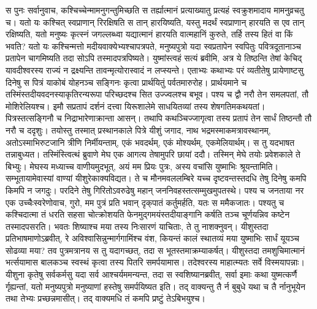 \vakya स पुनः सर्वानुवाच, कश्चिच्चेन्मामनुगन्तुमिच्छति स तर्ह्यात्मानं प्रत्याख्यातु प्रत्यहं स्वक्रुशमादाय मामनुव्रचतु च।
\vakya यतो यः कश्चित् स्वप्राणान् रिरक्षिषति स तान् हारयिष्यति, यस्तु मदर्थं स्वप्राणान् हारयति स एव तान् रक्षिष्यति,
\vakya यतो मनुष्यः कृत्स्नं जगल्लब्ध्वा यद्यात्मानं हारयति वात्महानिं कुरुते, तर्हि तस्य हितं वा किं भवति?
\vakya यतो यः कश्चिन्मत्तो मदीयवाक्येभ्यश्चापत्रपते, मनुष्यपुत्रो यदा स्वप्रतापेन स्वपितुः पवित्रदूतानाञ्च प्रतापेन चागमिष्यति तदा सोऽपि तस्मादपत्रपिष्यते।
\vakya युष्मांस्त्वहं सत्यं ब्रवीमि, अत्र ये तिष्ठन्ति तेषां केचिद् यावदीश्वरस्य राज्यं न द्रक्ष्यन्ति तावन्मृत्योरास्वादं न लप्स्यन्ते।
\vakya एताभ्यः कथाभ्यः परं व्यतीतेषु प्रायेणाष्टसु दिनेषु स पित्रं याकोबं योहनञ्च सङ्गिनः कृत्वा प्रार्थयितुं पर्वतमारुरोह।
\vakya प्रार्थयमाने च तस्मिंस्तदीयवदनस्याकृतिरन्यरूपा परिच्छदश्च सित उज्ज्वलश्च बभूव।
\vakya पश्य च द्वौ नरौ तेन समलपतां, तौ मोशिरेलियश्च।
\vakya इमौ सप्रतापं दर्शनं दत्त्वा यिरूशालेमे साधयितव्यां तस्य शेषगतिमकथयतां।
\vakya पित्रस्तत्सङ्गिनौ च निद्राभारेणाक्रान्ता आसन्। तथापि कथञ्चिज्जागृत्वा तस्य प्रतापं तेन सार्धं तिष्ठन्तौ तौ नरौ च ददृशुः।
\vakya तयोस्तु तस्मात् प्रस्थानकाले पित्रे यीशुं जगाद, नाथ भद्रमस्माकमत्रावस्थानम्, अतोऽस्माभिरुटजानि त्रीणि निर्मीयन्ताम्, एकं भवदर्थम्, एकं मोश्यर्थम्, एकमेलियार्थम्। स तु यदभाषत तन्नाबुध्यत।
\vakya तस्मिंस्त्वित्थं ब्रुवाणे मेघ एक आगत्य तेषामुपरि छायां ददौ।
\vakya तस्मिन् मेघे तयोः प्रवेशकाले ते बिभ्युः। मेघस्य मध्याच्च वाणीयमुदभूत्, अयं मम प्रियः पुत्रः, अस्य वचांसि युष्माभिः श्रूयन्तामिति।
\vakya सम्भूतायामेवास्यां वाण्यां यीशुरेकाक्यविद्यत। ते च मौनमवललम्बिरे यच्च दृष्टवन्तस्तदधि तेषु दिनेषु कमपि किमपि न जगदुः।
\vakya परदिने तेषु गिरितोऽवरुढेषु महान् जननिवहस्तत्सम्मुखमुपतस्थे।
\vakya पश्य च जनताया नर एक उच्चैःस्वरेणोवाच, गुरो, मम पुत्रं प्रति भवान् दृक्‌पातं कर्तुमर्हति, यतः स ममैकजातः।
\vakya पश्यतु च कश्चिदात्मा तं धरति सहसा चोत्क्रोशयति फेनमुद्गमयंस्तदीयाङ्गानि कर्षति तञ्च चूर्णयन्निव कष्टेन तस्मादपसरति।
\vakya भवतः शिष्याश्च मया तस्य निःसारणं याचिताः, ते तु नाशक्नुवन्।
\vakya यीशुस्तदा प्रतिभाषमाणोऽब्रवीत्, रे अविश्वासिन्नुन्मार्गगामिंश्च वंश, कियन्तं कालं स्थातव्यं मया युष्माभिः सार्धं यूयञ्च सोढव्या मया?
\vakya तव पुत्रमत्रानय स तु यदागच्छत्, तदा स भूतस्तमाक्रम्याकर्षत्। यीशुस्तदा तमशुचिमात्मानं भर्त्सयामास बालकञ्च स्वस्थं कृत्वा तस्य पितरि समर्पयामास।
\vakya तदेश्वरस्य माहात्म्यतः सर्वे विस्मयापन्नाः।
\vakya यीशुना कृतेषु सर्वकर्मसु यदा सर्व आश्चर्यममन्यन्त, तदा स स्वशिष्यानब्रवीत्, सर्वा इमाः कथा युष्मत्कर्णै र्गृह्यन्तां, यतो मनुष्यपुत्रो मनुष्याणां हस्तेषु समर्पयिष्यत इति।
\vakya तद् वाक्यन्तु तै र्न बुबुधे यथा च तै र्नानुभूयेन तथा तेभ्यः प्रच्छन्नमासीत्। तद् वाक्यमधि तं कमपि प्रष्टुं तेऽबिभयुश्च।
